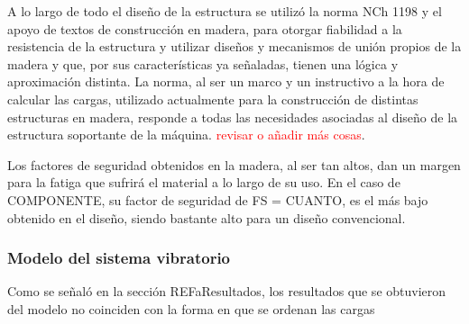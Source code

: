 A lo largo de todo el diseño de la estructura se utilizó la norma NCh 1198 y el apoyo de textos de construcción en madera, para otorgar fiabilidad a la resistencia de la estructura y utilizar diseños y mecanismos de unión propios de la madera y que, por sus características ya señaladas, tienen una lógica y aproximación distinta. La norma, al ser un marco y un instructivo a la hora de calcular las cargas, utilizado actualmente para la construcción de distintas estructuras en madera, responde a todas las necesidades asociadas al diseño de la estructura soportante de la máquina. \textcolor{red}{revisar o añadir más cosas}.

Los factores de seguridad obtenidos en la madera, al ser tan altos, dan un margen para la fatiga que sufrirá el material a lo largo de su uso. En el caso de COMPONENTE, su factor de seguridad de FS = CUANTO, es el más bajo obtenido en el diseño, siendo bastante alto para un diseño convencional.

\subsubsection{Modelo del sistema vibratorio}

Como se señaló en la sección REFaResultados, los resultados que se obtuvieron del modelo no coinciden con la forma en que se ordenan las cargas 




